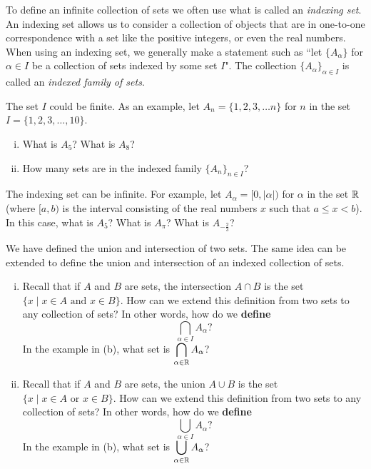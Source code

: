 \begin{activity}  To define an infinite collection of sets we often use what is called an \emph{indexing set}. An indexing set allows us to consider a collection of objects that are in one-to-one correspondence with a set like the positive integers, or even the real numbers. When using an indexing set, we generally make a statement such as ``let $\{A_{\alpha}\}$ for $\alpha \in I$ be a collection of sets indexed by some set $I$". The collection $\{A_{\alpha}\}_{\alpha \in I}$ is called an \emph{indexed family of sets}. 

	\ba
	\item The set $I$ could be finite. As an example, let $A_{n} = \{1, 2, 3, \ldots n\}$ for $n$ in the set $I = \{1,2,3, \ldots, 10\}$.
		\begin{enumerate}[i.]
		\item What is $A_5$? What is $A_{8}$? 
		
		\item How many sets are in the indexed family $\{A_n\}_{n \in I}$?
		\end{enumerate}
	
	\item The indexing set can be infinite. For example, let $A_{\alpha} = [0, |\alpha|)$ for $\alpha$ in the set $\mathbb{R}$ (where $[a,b)$ is the interval consisting of the real numbers $x$ such that $a \leq x < b$). In this case, what is $A_5$? What is $A_{\pi}$?  What is $A_{-\frac{2}{3}}$? 
		
	\item We have defined the union and intersection of two sets. The same idea can be extended to define the union and intersection of an indexed collection of sets. 
		\begin{enumerate}[i.]
		\item Recall that if $A$ and $B$ are sets, the intersection $A \cap B$ is the set $\{x \mid x \in A \text{ and } x \in B\}$. How can we extend this definition from two sets to any collection of sets? In other words, how do we \textbf{define}  
	\[\bigcap_{\alpha \in I} A_{\alpha}?\]
In the example in (b), what set is $\displaystyle \bigcap_{\alpha \in \mathbb{R}} A_{\alpha}$?
		
	\item Recall that if $A$ and $B$ are sets, the union $A \cup B$ is the set $\{x \mid x \in A \text{ or } x \in B\}$. How can we extend this definition from two sets to any collection of sets? In other words, how do we \textbf{define}  
	\[\bigcup_{\alpha \in I} A_{\alpha}?\]
In the example in (b), what set is $\displaystyle \bigcup_{\alpha \in \mathbb{R}} A_{\alpha}$?
	
	\end{enumerate}
	
	\ea

\end{activity}

